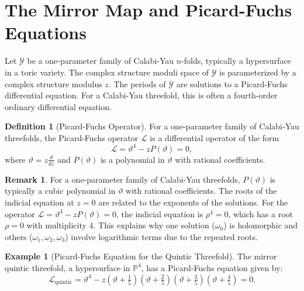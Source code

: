 \documentclass{book}
\newcommand{\varthetaop}{\vartheta} %
\newcommand{\calY}{\mathcal{Y}} %
\newcommand{\omegaf}{\omega_0} %
\newcommand{\omegal}{\omega_1} %
\newcommand{\zmod}{z} %
\theoremstyle{definition}
\newtheorem{definition}[theorem]{Definition}
\newtheorem{example}[theorem]{Example}
\newtheorem{remark}[theorem]{Remark}
\begin{document}
\section{The Mirror Map and Picard-Fuchs Equations}
Let $\calY$ be a one-parameter family of Calabi-Yau $n$-folds, typically a hypersurface in a toric variety. The complex structure moduli space of $\calY$ is parameterized by a complex structure modulus $\zmod$. The periods of $\calY$ are solutions to a Picard-Fuchs differential equation. For a Calabi-Yau threefold, this is often a fourth-order ordinary differential equation.

\begin{definition}[Picard-Fuchs Operator]
For a one-parameter family of Calabi-Yau threefolds, the Picard-Fuchs operator $\mathcal{L}$ is a differential operator of the form
\[
\mathcal{L} = \varthetaop^4 - \zmod P(\varthetaop) = 0,
\]
where $\varthetaop = \zmod \frac{d}{d\zmod}$ and $P(\varthetaop)$ is a polynomial in $\varthetaop$ with rational coefficients.
\end{definition}

\begin{remark}
For a one-parameter family of Calabi-Yau threefolds, $P(\varthetaop)$ is typically a cubic polynomial in $\varthetaop$ with rational coefficients. The roots of the indicial equation at $\zmod = 0$ are related to the exponents of the solutions. For the operator $\mathcal{L} = \varthetaop^4 - \zmod P(\varthetaop) = 0$, the indicial equation is $\rho^4 = 0$, which has a root $\rho=0$ with multiplicity 4. This explains why one solution ($\omegaf$) is holomorphic and others ($\omegal, \omega_2, \omega_3$) involve logarithmic terms due to the repeated roots.
\end{remark}

\begin{example}[Picard-Fuchs Equation for the Quintic Threefold]
The mirror quintic threefold, a hypersurface in $\mathbb{P}^4$, has a Picard-Fuchs equation given by:
\begin{equation}
\label{eq:quintic_PF}
\mathcal{L}_{\text{quintic}} = \varthetaop^4 - \zmod (\varthetaop + \tfrac{1}{5})(\varthetaop + \tfrac{2}{5})(\varthetaop + \tfrac{3}{5})(\varthetaop + \tfrac{4}{5}) = 0.
\end{equation}
\end{example}
\end{document}
